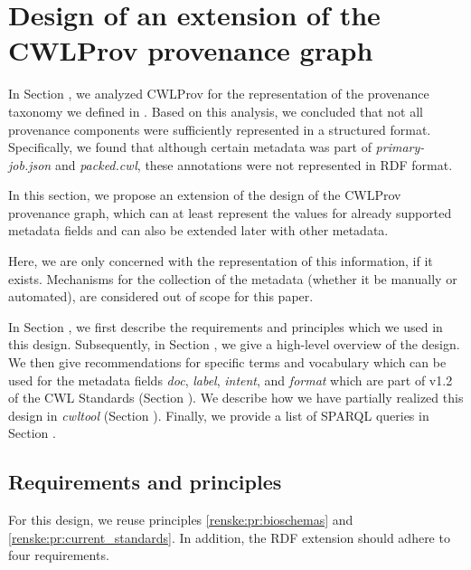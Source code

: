 \twocolumn
\section{Design of an extension of the CWLProv provenance graph}
\label{sec:renske:dev_recommendatons}





In Section \emph{}, we analyzed CWLProv for the representation of the provenance taxonomy we defined in \emph{}. Based on this analysis, we concluded that not all provenance components were sufficiently represented in a structured format. Specifically, we found that although certain metadata was part of \emph{primary-job.json} and \emph{packed.cwl}, these annotations were not represented in RDF format.

In this section, we propose an extension of the design of the CWLProv provenance graph, which can at least represent the values for already supported metadata fields and can also be extended later with other metadata. %

Here, we are only concerned with the representation of this information, if it exists. Mechanisms for the collection of the metadata (whether it be manually or automated), are considered out of scope for this paper. 

In Section \emph{}, we first describe the requirements and principles which we used in this design. Subsequently, in Section \emph{}, we give a high-level overview of the design. We then give recommendations for specific terms and vocabulary which can be used for the metadata fields \emph{doc}, \emph{label}, \emph{intent}, and \emph{format} which are part of v1.2 of the CWL Standards (Section \emph{}). We describe how we have partially realized this design in \emph{cwltool} (Section \emph{}). Finally, we provide a list of SPARQL queries in Section \emph{}.

\subsection{Requirements and principles}
\label{sec:renske:ext_reqs}
For this design, we reuse principles \ref{renske:pr:bioschemas} and \ref{renske:pr:current_standards}. In addition, the RDF extension should adhere to four requirements.

